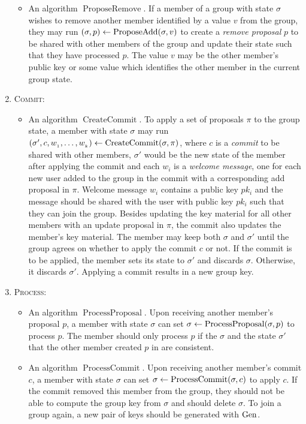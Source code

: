 \begin{definition}[CGKA]
\begin{enumerate}[1.]
\begin{itemize}
				\item An algorithm $\operatorname{ProposeRemove}$. If a member of a group with state $\sigma$ wishes to remove another member identified by a value $v$ from the group, they may run $(\sigma, p) \leftarrow \operatorname{ProposeAdd}(\sigma, v)$ to create a \emph{remove proposal} $p$ to be shared with other members of the group and update their state such that they have processed $p$. The value $v$ may be the other member's public key or some value which identifies the other member in the current group state.
			\end{itemize}
		\item[] \textsc{Commit:}
			\begin{itemize}
				\item An algorithm $\operatorname{CreateCommit}$. To apply a set of proposals $\pi$ to the group state, a member with state $\sigma$ may run $(\sigma', c, w_{_1}, \ldots, w_{_k}) \leftarrow \operatorname{CreateCommit}(\sigma, \pi)$, where $c$ is a \emph{commit} to be shared with other members, $\sigma'$ would be the new state of the member after applying the commit and each $w_{i}$ is a \emph{welcome message}, one for each new user added to the group in the commit with a corresponding add proposal in $\pi$. Welcome message $w_i$ contains a public key $pk_i$ and the message should be shared with the user with public key $pk_i$ such that they can join the group. Besides updating the key material for all other members with an update proposal in $\pi$, the commit also updates the member's key material. The member may keep both $\sigma$ and $\sigma'$ until the group agrees on whether to apply the commit $c$ or not. If the commit is to be applied, the member sets its state to $\sigma'$ and discards $\sigma$. Otherwise, it discards $\sigma'$. Applying a commit results in a new group key.
			\end{itemize}
		\item[] \textsc{Process:}
			\begin{itemize}
				\item An algorithm $\operatorname{ProcessProposal}$. Upon receiving another member's proposal $p$, a member with state $\sigma$ can set $\sigma \leftarrow \operatorname{ProcessProposal}(\sigma, p)$ to process $p$.
				      The member should only process $p$ if the $\sigma$ and the state $\sigma'$ that the other member created $p$ in are consistent.
				\item An algorithm $\operatorname{ProcessCommit}$. Upon receiving another member's commit $c$, a member with state $\sigma$ can set $\sigma \leftarrow \operatorname{ProcessCommit}(\sigma, c)$ to apply $c$. If the commit removed this member from the group, they should not be able to compute the group key from $\sigma$ and should delete $\sigma$. To join a group again, a new pair of keys should be generated with $\mathrm{Gen}$.

\end{itemize}
\end{enumerate}
\end{definition}
